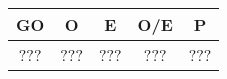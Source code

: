 \begin{tabular}{ccccc}
  \hline
  GO & O & E & O/E & P\\\hline
  ??? & ??? & ??? & ??? & ???\\
  \hline
\end{tabular}
